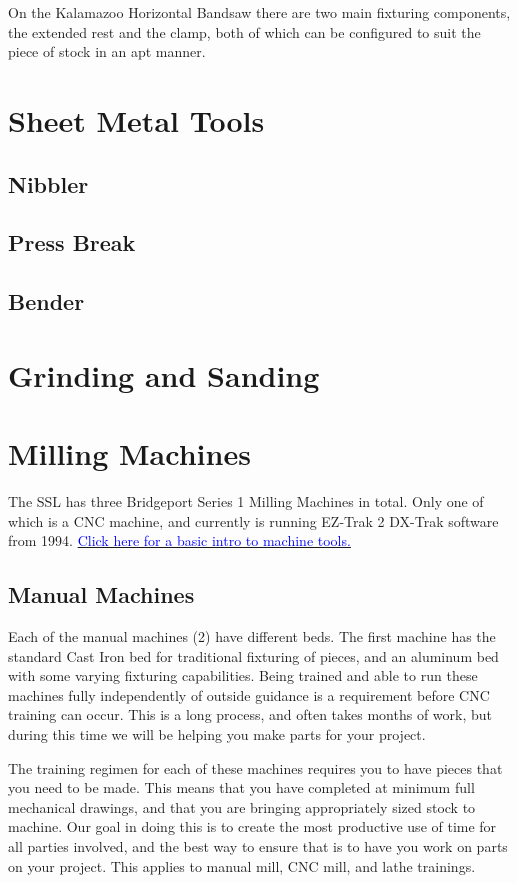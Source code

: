 \documentclass{article}
\begin{document}
On the Kalamazoo Horizontal Bandsaw there are two main fixturing components, the extended rest and the clamp, both of which can be configured to suit the piece of stock in an apt manner. 

\section{Sheet Metal Tools}

\subsection{Nibbler}

\subsection{Press Break}

\subsection{Bender}



\section{Grinding and Sanding}

\section{Milling Machines}
The SSL has three Bridgeport Series 1 Milling Machines in total. Only one of which is a CNC machine, and currently is running EZ-Trak 2 DX-Trak software from 1994. 
\href{https://autode.sk/2Bfp6qI}{\textcolor{blue}{Click here for a basic intro to machine tools.}}


\subsection{Manual Machines}
Each of the manual machines (2) have different beds. The first machine has the standard Cast Iron bed for traditional fixturing of pieces, and an aluminum bed with some varying fixturing capabilities. Being trained and able to run these machines fully independently of outside guidance is a requirement before CNC training can occur. This is a long process, and often takes months of work, but during this time we will be helping you make parts for your project.

The training regimen for each of these machines requires you to have pieces that you need to be made. This means that you have completed at minimum full mechanical drawings, and that you are bringing appropriately sized stock to machine. Our goal in doing this is to create the most productive use of time for all parties involved, and the best way to ensure that is to have you work on parts on your project. This applies to manual mill, CNC mill, and lathe trainings. 
\end{document}
